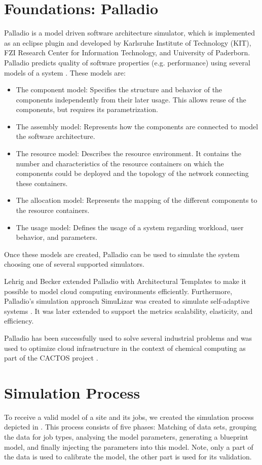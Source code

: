 \documentclass{webofc}
\begin{document}
\section{Foundations: Palladio}
\label{sec:palladio}
Palladio is a model driven software architecture simulator, which is implemented as an eclipse plugin and developed by Karlsruhe Institute of Technology (KIT), FZI Research Center for Information Technology, and University of Paderborn. Palladio predicts quality of software properties (e.g. performance) using several models of a system \cite{BECKER20093}. These models are: 
\begin{itemize}
	\item The component model: Specifies the structure and behavior of the components independently from their later usage. This allows reuse of the components, but requires its parametrization.
	\item The assembly model: Represents how the components are connected to model the software architecture.
	\item The resource model: Describes the resource environment. It contains the number and characteristics of the resource containers on which the components could be deployed and the topology of the network connecting these containers.
	\item The allocation model: Represents the mapping of the different components to the resource containers.
	\item The usage model: Defines the usage of a system regarding workload, user behavior, and parameters.
	
\end{itemize}
Once these models are created, Palladio can be used to simulate the system choosing one of several supported simulators. 

Lehrig and Becker \cite{arch} extended Palladio with Architectural Templates to make it possible to model cloud computing environments efficiently.
Furthermore, Palladio's simulation approach SimuLizar was created to simulate self-adaptive systems \cite{becker2013simulizar}.
It was later extended to support the metrics scalability, elasticity, and efficiency.

Palladio has been successfully used to solve several industrial problems and was used to optimize cloud infrastructure in the context of chemical computing as part of the CACTOS project \cite{rapidtesting}. 

\section{Simulation Process}
\label{sec:process}
To receive a valid model of a site and its jobs, we created the simulation process depicted in . This process consists of five phases: Matching of data sets, grouping the data for job types, analysing the model parameters, generating a blueprint model, and finally injecting the parameters into this model. Note, only a part of the data is used to calibrate the model, the other part is used for its validation.
\end{document}
